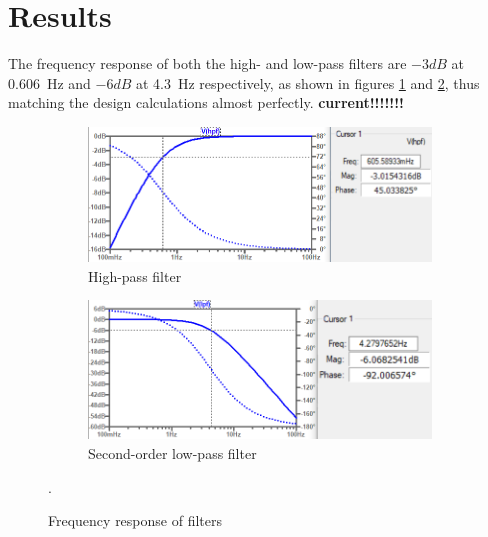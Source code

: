 \section{Results} \label{sec:heartResults}
The frequency response of both the high- and low-pass filters are $-3dB$ at \SI{0.606}{Hz} and $-6dB$ at \SI{4.3}{Hz} respectively, as shown in figures \ref{subfig:hpf} and \ref{subfig:lpf1}, thus matching the design calculations almost perfectly. \textbf{current!!!!!!!}
\begin{figure}[h]
 \footnotesize
   \centering
   \begin{subfigure}[]{0.48\textwidth}
        \includegraphics[width=\linewidth]{./Figures/hpf}
	  \caption{High-pass filter} \label{subfig:hpf}	
   \end{subfigure}
   \begin{subfigure}[]{0.48\textwidth}
  	 \includegraphics[width=\linewidth]{./Figures/lpf1}
	  \caption{Second-order low-pass filter} \label{subfig:lpf1}	
   \end{subfigure}
      
   \caption {Frequency response of filters}.
   \label{fig:freqreq}
 \end{figure}

